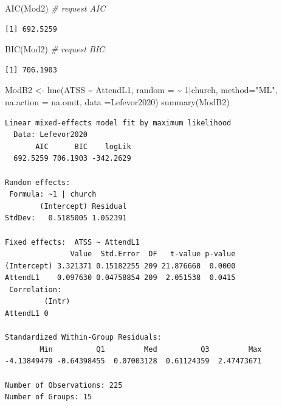 \documentclass[
  11pt,
]{book}
\newenvironment{Shaded}{\begin{snugshade}}{\end{snugshade}}
\newcommand{\AttributeTok}[1]{\textcolor[rgb]{0.77,0.63,0.00}{#1}}
\newcommand{\CommentTok}[1]{\textcolor[rgb]{0.56,0.35,0.01}{\textit{#1}}}
\newcommand{\DecValTok}[1]{\textcolor[rgb]{0.00,0.00,0.81}{#1}}
\newcommand{\FunctionTok}[1]{\textcolor[rgb]{0.00,0.00,0.00}{#1}}
\newcommand{\NormalTok}[1]{#1}
\newcommand{\OtherTok}[1]{\textcolor[rgb]{0.56,0.35,0.01}{#1}}
\newcommand{\SpecialCharTok}[1]{\textcolor[rgb]{0.00,0.00,0.00}{#1}}
\newcommand{\StringTok}[1]{\textcolor[rgb]{0.31,0.60,0.02}{#1}}
\begin{document}
\begin{Shaded}
\begin{Highlighting}[]
\FunctionTok{AIC}\NormalTok{(Mod2) }\CommentTok{\# request AIC}
\end{Highlighting}
\end{Shaded}

\begin{verbatim}
[1] 692.5259
\end{verbatim}

\begin{Shaded}
\begin{Highlighting}[]
\FunctionTok{BIC}\NormalTok{(Mod2) }\CommentTok{\# request BIC}
\end{Highlighting}
\end{Shaded}

\begin{verbatim}
[1] 706.1903
\end{verbatim}

\begin{Shaded}
\begin{Highlighting}[]
\NormalTok{ModB2 }\OtherTok{\textless{}{-}} \FunctionTok{lme}\NormalTok{(ATSS }\SpecialCharTok{\textasciitilde{}}\NormalTok{  AttendL1, }\AttributeTok{random =} \SpecialCharTok{\textasciitilde{}} \DecValTok{1}\SpecialCharTok{|}\NormalTok{church, }\AttributeTok{method=}\StringTok{"ML"}\NormalTok{, }\AttributeTok{na.action =}\NormalTok{ na.omit, }\AttributeTok{data =}\NormalTok{Lefevor2020)}
\FunctionTok{summary}\NormalTok{(ModB2)}
\end{Highlighting}
\end{Shaded}

\begin{verbatim}
Linear mixed-effects model fit by maximum likelihood
  Data: Lefevor2020 
       AIC      BIC    logLik
  692.5259 706.1903 -342.2629

Random effects:
 Formula: ~1 | church
        (Intercept) Residual
StdDev:   0.5185005 1.052391

Fixed effects:  ATSS ~ AttendL1 
               Value  Std.Error  DF   t-value p-value
(Intercept) 3.321371 0.15182255 209 21.876668  0.0000
AttendL1    0.097630 0.04758854 209  2.051538  0.0415
 Correlation: 
         (Intr)
AttendL1 0     

Standardized Within-Group Residuals:
        Min          Q1         Med          Q3         Max 
-4.13849479 -0.64398455  0.07003128  0.61124359  2.47473671 

Number of Observations: 225
Number of Groups: 15 
\end{verbatim}
\end{document}
